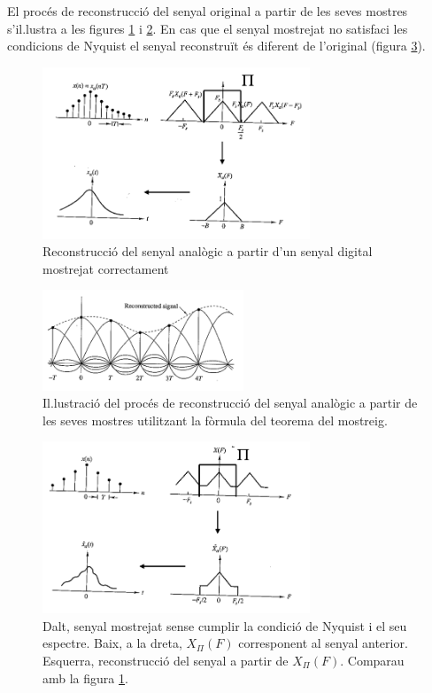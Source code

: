 \documentclass{article}
\begin{document}
El proc\'es de reconstrucci\'o del senyal original a partir de les seves mostres s'il.lustra 
a les figures \ref{exrecons1} i \ref{exrecons2}. En cas que el senyal mostrejat no satisfaci les condicions de Nyquist
el senyal reconstru\"it \'es diferent de l'original (figura \ref{exmalarecons}).

\begin{figure}[htbp]
\begin{center}
\includegraphics[width=8cm]{exrecons1.png}
\end{center}
\caption{Reconstrucci\'o del senyal anal\`ogic a partir d'un senyal digital mostrejat correctament}
\label{exrecons1}
\end{figure}

\begin{figure}[htbp]
\begin{center}
\includegraphics[width=6cm]{exrecons2.png}
\end{center}
\caption{Il.lustraci\'o del proc\'es de reconstrucci\'o del senyal anal\`ogic a partir de les
seves mostres utilitzant la f\`ormula del teorema del mostreig.}
\label{exrecons2}
\end{figure}

\begin{figure}[htbp]
\begin{center}
\includegraphics[width=8cm]{exmalarecons.png}
\end{center}
\caption{Dalt, senyal mostrejat sense cumplir la condici\'o de Nyquist i el seu espectre.
Baix, a la dreta, $X_{\Pi}(F)$ corresponent al senyal anterior. Esquerra, reconstrucci\'o del
senyal a partir de $X_{\Pi}(F)$. Comparau amb la figura \ref{exrecons1}.}
\label{exmalarecons}
\end{figure}
\end{document}
